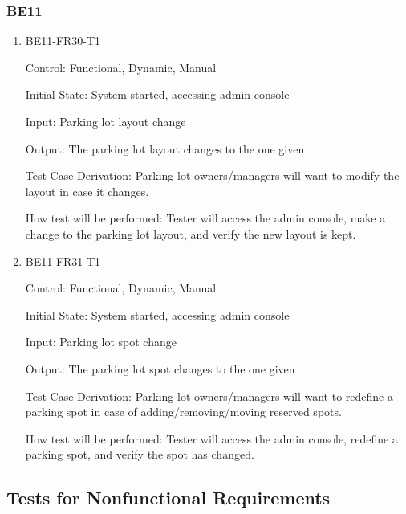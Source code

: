 \documentclass[12pt, titlepage]{article}
\begin{document}
\subsubsection{BE11}

\begin{enumerate}

    \item{BE11-FR30-T1}

    Control: Functional, Dynamic, Manual
    					
    Initial State: System started, accessing admin console
    					
    Input: Parking lot layout change
    					
    Output: The parking lot layout changes to the one given
    
    Test Case Derivation: Parking lot owners/managers will want to modify the
    layout in case it changes.
    					
    How test will be performed: Tester will access the admin console, make a
    change to the parking lot layout, and verify the new layout is kept.

    \item{BE11-FR31-T1}

    Control: Functional, Dynamic, Manual
    					
    Initial State: System started, accessing admin console
    					
    Input: Parking lot spot change
    					
    Output: The parking lot spot changes to the one given
    
    Test Case Derivation: Parking lot owners/managers will want to redefine a
    parking spot in case of adding/removing/moving reserved spots.
    					
    How test will be performed: Tester will access the admin console, redefine a
    parking spot, and verify the spot has changed.

    \end{enumerate}
    
\subsection{Tests for Nonfunctional Requirements}
\label{sec:5.2}

\end{document}
